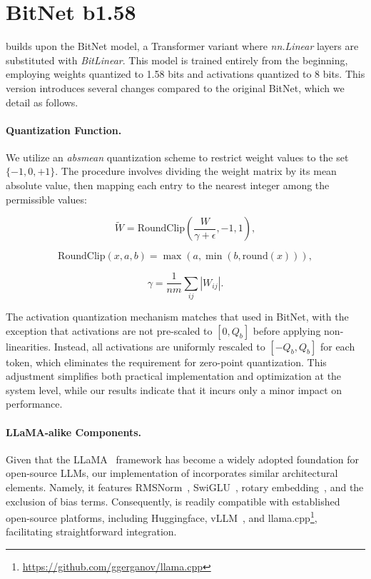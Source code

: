 \section{BitNet b1.58}

 builds upon the BitNet model, a Transformer variant where \emph{nn.Linear} layers are substituted with \emph{BitLinear}. This model is trained entirely from the beginning, employing weights quantized to 1.58 bits and activations quantized to 8 bits. This version introduces several changes compared to the original BitNet, which we detail as follows.

\paragraph{Quantization Function.} We utilize an \emph{absmean} quantization scheme to restrict weight values to the set $\{-1, 0, +1\}$. The procedure involves dividing the weight matrix by its mean absolute value, then mapping each entry to the nearest integer among the permissible values:

\begin{equation}
    \widetilde{W} = \mathrm{RoundClip}(\frac{W}{\gamma + \epsilon}, -1, 1),
\end{equation}

\begin{equation}
    \mathrm{RoundClip}(x, a, b) = \max(a, \min(b, \mathrm{round}(x))),
\end{equation}

\begin{equation}
    \gamma = \frac{1}{nm}\sum_{ij} |W_{ij}|.
\end{equation}

The activation quantization mechanism matches that used in BitNet, with the exception that activations are not pre-scaled to $[0, Q_b]$ before applying non-linearities. Instead, all activations are uniformly rescaled to $[-Q_b, Q_b]$ for each token, which eliminates the requirement for zero-point quantization. This adjustment simplifies both practical implementation and optimization at the system level, while our results indicate that it incurs only a minor impact on performance.

\paragraph{LLaMA-alike Components.}

Given that the LLaMA~\cite{llama, llama2} framework has become a widely adopted foundation for open-source LLMs, our implementation of  incorporates similar architectural elements. Namely, it features RMSNorm~\cite{rmsnorm}, SwiGLU~\cite{swiglu}, rotary embedding~\cite{rope}, and the exclusion of bias terms. Consequently,  is readily compatible with established open-source platforms, including Huggingface, vLLM~\cite{vllm}, and llama.cpp\footnote{\url{https://github.com/ggerganov/llama.cpp}}, facilitating straightforward integration.

